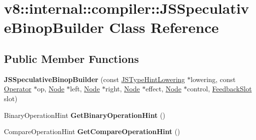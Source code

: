 \hypertarget{classv8_1_1internal_1_1compiler_1_1JSSpeculativeBinopBuilder}{}\section{v8\+:\+:internal\+:\+:compiler\+:\+:J\+S\+Speculative\+Binop\+Builder Class Reference}
\label{classv8_1_1internal_1_1compiler_1_1JSSpeculativeBinopBuilder}
\subsection*{Public Member Functions}
\begin{DoxyCompactItemize}
\item 
\mbox{\label{classv8_1_1internal_1_1compiler_1_1JSSpeculativeBinopBuilder_a9f9e7f34bb9158348546ff8b31667bbd}} 
{\bfseries J\+S\+Speculative\+Binop\+Builder} (const \mbox{\hyperlink{classv8_1_1internal_1_1compiler_1_1JSTypeHintLowering}{J\+S\+Type\+Hint\+Lowering}} $\ast$lowering, const \mbox{\hyperlink{classv8_1_1internal_1_1compiler_1_1Operator}{Operator}} $\ast$op, \mbox{\hyperlink{classv8_1_1internal_1_1compiler_1_1Node}{Node}} $\ast$left, \mbox{\hyperlink{classv8_1_1internal_1_1compiler_1_1Node}{Node}} $\ast$right, \mbox{\hyperlink{classv8_1_1internal_1_1compiler_1_1Node}{Node}} $\ast$effect, \mbox{\hyperlink{classv8_1_1internal_1_1compiler_1_1Node}{Node}} $\ast$control, \mbox{\hyperlink{classv8_1_1internal_1_1FeedbackSlot}{Feedback\+Slot}} slot)
\item 
\mbox{\label{classv8_1_1internal_1_1compiler_1_1JSSpeculativeBinopBuilder_aef755bc1a39954265db02e19d1b5faa9}} 
Binary\+Operation\+Hint {\bfseries Get\+Binary\+Operation\+Hint} ()
\item 
\mbox{\label{classv8_1_1internal_1_1compiler_1_1JSSpeculativeBinopBuilder_a532867e7c4368307ab4eab3bed89ba93}} 
Compare\+Operation\+Hint {\bfseries Get\+Compare\+Operation\+Hint} ()
\item 
\mbox{\label{classv8_1_1internal_1_1compiler_1_1JSSpeculativeBinopBuilder_a70bca65fe845bcd8fc5adf857b552a1a}} 

\end{DoxyCompactItemize}
